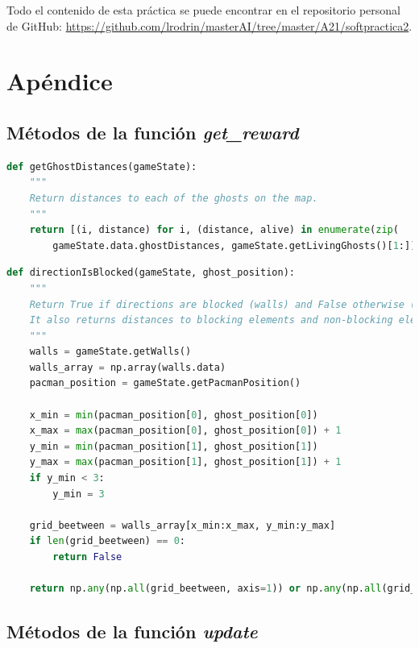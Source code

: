 \documentclass[11pt]{exam}
\begin{document}
Todo el contenido de esta práctica se puede encontrar en el repositorio personal de GitHub: \url{https://github.com/lrodrin/masterAI/tree/master/A21/softpractica2}.

\section{Apéndice}\label{apendice}

\subsection{Métodos de la función \textit{get\_reward}}\label{apendice_reward}

\begin{lstlisting}[language=python, basicstyle=\footnotesize]
def getGhostDistances(gameState):
	"""
	Return distances to each of the ghosts on the map.
	"""
	return [(i, distance) for i, (distance, alive) in enumerate(zip(
		gameState.data.ghostDistances, gameState.getLivingGhosts()[1:])) if alive]
\end{lstlisting}

\begin{lstlisting}[language=python, basicstyle=\footnotesize]
def directionIsBlocked(gameState, ghost_position):
	"""
	Return True if directions are blocked (walls) and False otherwise (no walls).
	It also returns distances to blocking elements and non-blocking elements.
	"""
	walls = gameState.getWalls()
	walls_array = np.array(walls.data)
	pacman_position = gameState.getPacmanPosition()
	
	x_min = min(pacman_position[0], ghost_position[0])
	x_max = max(pacman_position[0], ghost_position[0]) + 1
	y_min = min(pacman_position[1], ghost_position[1])
	y_max = max(pacman_position[1], ghost_position[1]) + 1
	if y_min < 3:
		y_min = 3
	
	grid_beetween = walls_array[x_min:x_max, y_min:y_max]
	if len(grid_beetween) == 0:
		return False
	
	return np.any(np.all(grid_beetween, axis=1)) or np.any(np.all(grid_beetween, axis=0))
\end{lstlisting}

\subsection{Métodos de la función \textit{update}}\label{apendice_update}
\end{document}
